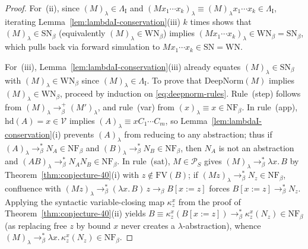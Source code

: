 \documentclass[11pt,reqno]{amsart}
\numberwithin{equation}{section}
\theoremstyle{plain}
\theoremstyle{definition}
\theoremstyle{remark}
\newcommand{\NF}{\mathrm{NF}}
\newcommand{\SN}{\mathrm{SN}}
\newcommand{\WN}{\mathrm{WN}}
\begin{document}
\begin{proof}
For~(ii), since $(M)_\lambda \in \Lambda_{\mathrm{I}}$ and $(M x_1 \cdots x_k)_\lambda \equiv (M)_\lambda x_1 \cdots x_k \in \Lambda_{\mathrm{I}}$, iterating Lemma~\ref{lem:lambdaI-conservation}(iii) $k$ times shows that $(M)_\lambda \in \SN_\beta$ (equivalently $(M)_\lambda \in \WN_\beta$) implies $(M x_1 \cdots x_k)_\lambda \in \WN_\beta = \SN_\beta$, which pulls back via forward simulation to $M x_1 \cdots x_k \in \SN = \WN$.

For~(iii), Lemma~\ref{lem:lambdaI-conservation}(iii) already equates $(M)_\lambda \in \SN_\beta$ with $(M)_\lambda \in \WN_\beta$ since $(M)_\lambda \in \Lambda_{\mathrm{I}}$. To prove that $\mathrm{DeepNorm}(M)$ implies $(M)_\lambda \in \WN_\beta$, proceed by induction on \eqref{eq:deepnorm-rules}. Rule~(step) follows from $(M)_\lambda \to_\beta^+ (M')_\lambda$, and rule~(var) from $(x)_\lambda \equiv x \in \NF_\beta$. In rule~(app), $\mathrm{hd}(A) = x \in \mathcal{V}$ implies $(A)_\lambda \equiv x C_1 \cdots C_m$, so Lemma~\ref{lem:lambdaI-conservation}(i) prevents $(A)_\lambda$ from reducing to any abstraction; thus if $(A)_\lambda \to_\beta^* N_A \in \NF_\beta$ and $(B)_\lambda \to_\beta^* N_B \in \NF_\beta$, then $N_A$ is not an abstraction and $(A B)_\lambda \to_\beta^* N_A N_B \in \NF_\beta$. In rule~(sat), $M \in \mathcal{P}_S$ gives $(M)_\lambda \to_\beta^* \lambda x.\, B$ by Theorem~\ref{thm:conjecture-40}(i) with $z \notin \mathrm{FV}(B)$; if $(M z)_\lambda \to_\beta^* N_z \in \NF_\beta$, confluence with $(M z)_\lambda \to_\beta^* (\lambda x.\, B)\,z \to_\beta B[x := z]$ forces $B[x := z] \to_\beta^* N_z$. Applying the syntactic variable-closing map $\kappa_z^x$ from the proof of Theorem~\ref{thm:conjecture-40}(ii) yields $B \equiv \kappa_z^x(B[x := z]) \to_\beta^* \kappa_z^x(N_z) \in \NF_\beta$ (as replacing free $z$ by bound $x$ never creates a $\lambda$-abstraction), whence $(M)_\lambda \to_\beta^* \lambda x.\, \kappa_z^x(N_z) \in \NF_\beta$.


\end{proof}
\end{document}
